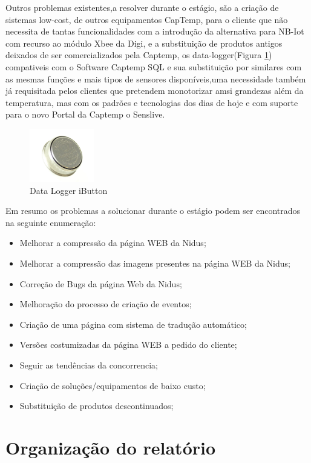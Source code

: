 Outros problemas existentes,a resolver durante o estágio, são a criação de sistemas low-cost, de outros equipamentos CapTemp, para o cliente que não necessita de tantas funcionalidades com a introdução da alternativa para NB-Iot com recurso ao módulo Xbee da Digi, e a substituição de produtos antigos deixados de ser comercializados pela Captemp, os data-logger(Figura \ref{ds1921}) compativeis com o Software Captemp SQL e sua substituição por similares com as mesmas funções e mais tipos de sensores disponíveis,uma necessidade também já requisitada pelos clientes que pretendem monotorizar amsi grandezas além da temperatura, mas com os padrões e tecnologias dos dias de hoje e com suporte para o novo Portal da Captemp o Senslive.
\begin{figure}[htb]
  \centering
  \includegraphics[width=0.25\textwidth]{images/ds1921.jpg}
  \caption{Data Logger iButton}\label{ds1921}
\end{figure}
\par
Em resumo os problemas a solucionar durante o estágio podem ser encontrados na seguinte enumeração:
\begin{itemize}
\item Melhorar a compressão da página WEB da Nidus;
\item Melhorar a compressão das imagens presentes na página WEB da Nidus;
\item Correção de Bugs da página Web da Nidus;
\item Melhoração do processo de criação de eventos;
\item Criação de uma página com sistema de tradução automático;
\item Versões costumizadas da página WEB a pedido do cliente;
\item Seguir as tendências da concorrencia;
\item Criação de soluções/equipamentos de baixo custo;
\item Substituição de produtos descontinuados;
\end{itemize}

\section{Organização do relatório}

